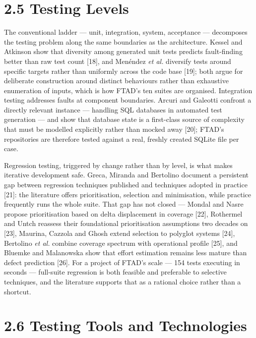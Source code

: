 \documentclass[
  12pt,
]{report}
\begin{document}
\section{2.5 Testing Levels}\label{testing-levels}

The conventional ladder --- unit, integration, system, acceptance ---
decomposes the testing problem along the same boundaries as the
architecture. Kessel and Atkinson show that diversity among generated
unit tests predicts fault-finding better than raw test count {[}18{]},
and Menéndez \emph{et al.} diversify tests around specific targets
rather than uniformly across the code base {[}19{]}; both argue for
deliberate construction around distinct behaviours rather than
exhaustive enumeration of inputs, which is how FTAD's ten suites are
organised. Integration testing addresses faults at component boundaries.
Arcuri and Galeotti confront a directly relevant instance --- handling
SQL databases in automated test generation --- and show that database
state is a first-class source of complexity that must be modelled
explicitly rather than mocked away {[}20{]}; FTAD's repositories are
therefore tested against a real, freshly created SQLite file per case.

Regression testing, triggered by change rather than by level, is what
makes iterative development safe. Greca, Miranda and Bertolino document
a persistent gap between regression techniques published and techniques
adopted in practice {[}21{]}: the literature offers prioritisation,
selection and minimisation, while practice frequently runs the whole
suite. That gap has not closed --- Mondal and Nasre propose
prioritisation based on delta displacement in coverage {[}22{]},
Rothermel and Untch reassess their foundational prioritisation
assumptions two decades on {[}23{]}, Maurina, Cazzola and Ghosh extend
selection to polyglot systems {[}24{]}, Bertolino \emph{et al.} combine
coverage spectrum with operational profile {[}25{]}, and Bluemke and
Malanowska show that effort estimation remains less mature than defect
prediction {[}26{]}. For a project of FTAD's scale --- 154 tests
executing in seconds --- full-suite regression is both feasible and
preferable to selective techniques, and the literature supports that as
a rational choice rather than a shortcut.

\section{2.6 Testing Tools and
Technologies}\label{testing-tools-and-technologies}
\end{document}

